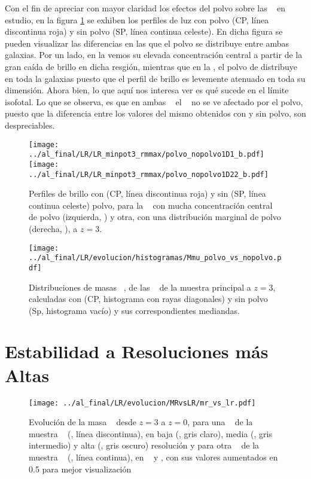 Con el fin de apreciar con mayor claridad los efectos del polvo sobre las \bcgs~ en estudio,
en la figura \ref{fig:perfiles} se exhiben los perfiles de luz
con polvo (CP, l\'inea discontinua roja) y sin polvo (SP, l\'inea continua celeste). En dicha figura se
pueden visualizar las diferencias en las que el polvo se distribuye entre ambas galaxias.
Por un lado, en la  vemos su elevada concentraci\'on
central a partir de la gran ca\'ida de 
brillo en dicha resgi\'on, mientras que en la , el polvo de distribuye en toda la galaxias
puesto que el perfil de brillo es levemente atenuado en toda su dimensi\'on. Ahora bien, lo que aqu\'i
nos interesa ver es qu\'e sucede en el l\'imite isofotal. Lo que se observa, es que en ambas \bcgs~
el \rvc~ no se ve afectado por el polvo, puesto que la diferencia entre los valores del mismo
obtenidos con y sin
polvo, son despreciables.

\begin{figure}[H]
\centering
 \texttt{[image: ../al\_final/LR/LR\_minpot3\_rmmax/polvo\_nopolvo1D1\_b.pdf]}
 \texttt{[image: ../al\_final/LR/LR\_minpot3\_rmmax/polvo\_nopolvo1D22\_b.pdf]}
\caption{Perfiles de brillo con (CP, l\'inea discontinua roja) y sin (SP, l\'inea continua celeste) polvo, para la \bcg~ con mucha
concentraci\'on central de polvo (izquierda, ) y otra, con una distribuci\'on marginal de polvo (derecha, ), a $z=3$.}
\label{fig:perfiles}
\end{figure}



\begin{figure}[H]
 \centering
 \texttt{[image: ../al\_final/LR/evolucion/histogramas/Mmu\_polvo\_vs\_nopolvo.pdf]}
\caption{Distribuciones de masas \mvc~, de las \bcgs~ de la muestra principal a $z=3$, calculadas con (CP, histograma con rayas diagonales) y sin polvo (Sp, histograma vac\'io) y sus correspondientes mediandas.}
\label{fig:histpnp}
\end{figure}


\section{Estabilidad a Resoluciones m\'as Altas}
\begin{figure}[H]
 \centering
 \texttt{[image: ../al\_final/LR/evolucion/MRvsLR/mr\_vs\_lr.pdf]}
\caption{Evoluci\'on de la masa \mvc~ desde $z=3$ a $z=0$, para una \bcg~ de la muestra \cmen~ (, l\'inea discontinua), en baja (\lr, gris claro), media (\mr, gris intermedio) y alta (\hr, gris oscuro) resoluci\'on y para otra
\bcg~ de la muestra \cmay~ (, l\'inea continua), en \lr~ y \mr, con sus valores aumentados en 0.5 para mejor visualizaci\'on}
\label{fig:estabilidad}
\end{figure}

